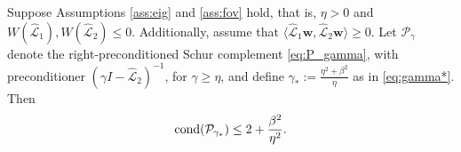 \documentclass[review]{siamart}
\begin{document}
%
\begin{theorem}\label{th:cond}
Suppose Assumptions \ref{ass:eig} and \ref{ass:fov} hold, that is, $\eta > 0$
and $W(\widehat{\mathcal{L}}_1),W(\widehat{\mathcal{L}}_2) \leq 0$.
Additionally, assume that $\langle\widehat{\mathcal{L}}_1\mathbf{w},
\widehat{\mathcal{L}}_2\mathbf{w}\rangle\geq 0$. Let $\mathcal{P}_\gamma$
denote the right-preconditioned Schur complement \eqref{eq:P_gamma}, with
preconditioner $(\gamma I - \widehat{\mathcal{L}}_2)^{-1}$, for $\gamma \geq\eta$,
and define $\gamma_* := \tfrac{\eta^2+\beta^2}{\eta}$ as in \eqref{eq:gamma*}.
Then
\begin{align}\label{eq:gammastar_cond}
\textnormal{cond}(\mathcal{P}_{\gamma_*}) \leq
	2 + \frac{\beta^2}{\eta^2}.
\end{align}
\end{theorem}
\end{document}
